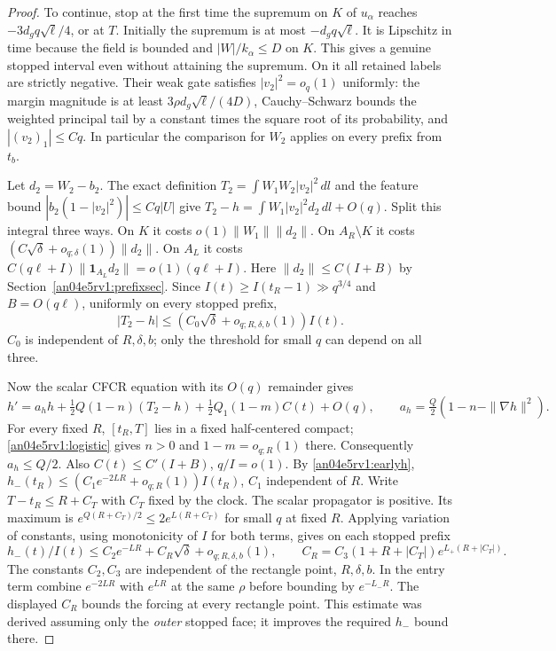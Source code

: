 \documentclass[11pt]{article}
\newcommand{\dd}{\,dl}
\begin{document}
\begin{proof}
To continue, stop at the first time the supremum on $K$ of $u_\alpha$ reaches $-3d_gq\sqrt\ell/4$, or at $T$. Initially the supremum is at most $-d_gq\sqrt\ell$. It is Lipschitz in time because the field is bounded and $|W|/k_\alpha\le D$ on $K$. This gives a genuine stopped interval even without attaining the supremum. On it all retained labels are strictly negative. Their weak gate satisfies $|v_2|^2=o_q(1)$ uniformly: the margin magnitude is at least $3\rho d_g\sqrt\ell/(4D)$, Cauchy--Schwarz bounds the weighted principal tail by a constant times the square root of its probability, and $|(v_2)_1|\le Cq$. In particular the comparison for $W_2$ applies on every prefix from $t_b$.

Let $d_2=W_2-b_2$. The exact definition $T_2=\int W_1W_2|v_2|^2\dd$ and the feature bound $|b_2(1-|v_2|^2)|\le Cq|U|$ give $T_2-h=\int W_1|v_2|^2d_2\dd+O(q)$. Split this integral three ways. On $K$ it costs $o(1)\|W_1\|\|d_2\|$. On $A_R\setminus K$ it costs $(C\sqrt\delta+o_{q;\delta}(1))\|d_2\|$. On $A_L$ it costs $C(q\ell+I)\|\mathbf1_{A_L}d_2\|=o(1)(q\ell+I)$. Here $\|d_2\|\le C(I+B)$ by Section~\ref{an04e5rv1:prefixsec}. Since $I(t)\ge I(t_R-1)\gg q^{3/4}$ and $B=O(q\ell)$, uniformly on every stopped prefix,
\begin{equation}\label{an04e5rv1:t2}
 |T_2-h|\le(C_0\sqrt\delta+o_{q;R,\delta,b}(1))I(t).
\end{equation}
$C_0$ is independent of $R,\delta,b$; only the threshold for small $q$ can depend on all three.

Now the scalar CFCR equation with its $O(q)$ remainder gives
\[
 h'=a_h h+\tfrac12 Q(1-n)(T_2-h)+\tfrac12 Q_1(1-m)C(t)+O(q),
 \qquad a_h=\tfrac Q2(1-n-\|\nabla h\|^2).
\]
For every fixed $R$, $[t_R,T]$ lies in a fixed half-centered compact; \eqref{an04e5rv1:logistic} gives $n>0$ and $1-m=o_{q;R}(1)$ there. Consequently $a_h\le Q/2$. Also $C(t)\le C'(I+B)$, $q/I=o(1)$. By \eqref{an04e5rv1:earlyh},
$h_-(t_R)\le(C_1 e^{-2LR}+o_{q;R}(1))I(t_R)$, $C_1$ independent of $R$. Write $T-t_R\le R+C_T$ with $C_T$ fixed by the clock. The scalar propagator is positive. Its maximum is $e^{Q(R+C_T)/2}\le 2e^{L(R+C_T)}$ for small $q$ at fixed $R$. Applying variation of constants, using monotonicity of $I$ for both terms, gives on each stopped prefix
\[
 h_-(t)/I(t)\le C_2e^{-LR}+C_R\sqrt\delta+o_{q;R,\delta,b}(1),
 \qquad C_R=C_3(1+R+|C_T|)e^{L_+(R+|C_T|)}.
\]
The constants $C_2,C_3$ are independent of the rectangle point, $R,\delta,b$. In the entry term combine $e^{-2LR}$ with $e^{LR}$ at the same $\rho$ before bounding by $e^{-L_-R}$. The displayed $C_R$ bounds the forcing at every rectangle point. This estimate was derived assuming only the \emph{outer} stopped face; it improves the required $h_-$ bound there.


\end{proof}
\end{document}
